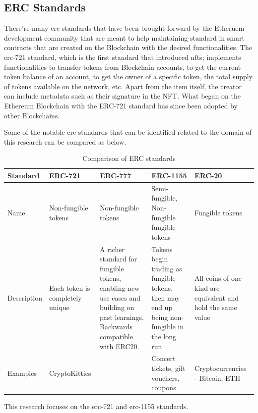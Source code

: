 \subsection{ERC Standards}

There're many \gls{erc} standards that have been brought forward by the Etheruem \autocite{wood_ethereum_2014} development community that are meant to help maintaining standard in smart contracts that are created on the Blockchain with the desired functionalities.
\bigbreak
The \gls{erc}-721 standard, which is the first standard that introduced \gls{nft}s; implements functionalities to transfer tokens from Blockchain accounts, to get the current token balance of an account, to get the owner of a specific token, the total supply of tokens available on the network, etc. Apart from the item itself, the creator can include metadata such as their signature in the NFT. What began on the Ethereum Blockchain with the ERC-721 standard has since been adopted by other Blockchains. 


Some of the notable \gls{erc} standards that can be identified related to the domain of this research can be compared as below.
\begin{longtable}{|p{}|p{}|p{}|p{}|p{}|}
\caption{Comparison of ERC standards}
\label{tab:erc-comparison}\\
\hline
Standard & ERC-721 & ERC-777 & ERC-1155 & ERC-20 \\ 
\hline
Name & Non-fungible tokens & Non-fungible tokens \autocite{dafflon_eip-777_2017} & Semi-fungible, Non-fungible  fungible tokens & Fungible tokens \\ 
\hline
Description & Each token is completely unique & A richer standard for fungible tokens, enabling new use cases and building on past learnings. Backwards compatible with ERC20. & Tokens begin trading as fungible tokens, then may end up being non-fungible in the long run & All coins of one kind are equivalent and hold the same value \\ 
\hline
Examples & CryptoKitties \autocite{cryptokitties_cryptokitties_nodate} &  & Concert tickets, gift vouchers, coupons & Cryptocurrencies - Bitcoin, ETH \\
\hline
\end{longtable}

This research focuses on the \gls{erc}-721 and \gls{erc}-1155 \autocite{prathap_semi-fungible_2021} standards.

